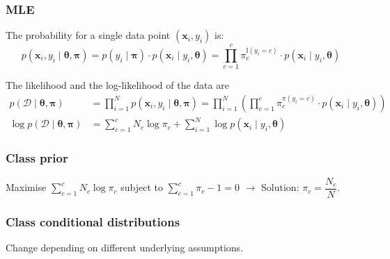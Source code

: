 \documentclass[11pt, %
	oneside, %
	english, %
	onehalfspacing, %
	parskip, %
	]{article} %
\theoremstyle{definition}
\begin{document}
\subsubsection*{MLE}

The probability for a single data point $\left(\mathbf{x}_i, y_i\right)$ is:
$$
p\left(\mathbf{x}_i, y_i \mid \boldsymbol{\theta}, \boldsymbol{\pi}\right)=p\left(y_i \mid \boldsymbol{\pi}\right) \cdot p\left(\mathbf{x}_i \mid y_i, \boldsymbol{\theta}\right)=\prod_{c=1}^c \pi_c^{\mathbb{I}\left(y_i=c\right)} \cdot p\left(\mathbf{x}_i \mid y_i, \boldsymbol{\theta}\right)
$$

The likelihood and the log-likelihood of the data are
$$
\begin{aligned}
p(\mathcal{D} \mid \boldsymbol{\theta}, \boldsymbol{\pi}) & =\prod_{i=1}^N p\left(\mathbf{x}_i, y_i \mid \boldsymbol{\theta}, \boldsymbol{\pi}\right)=\prod_{i=1}^N\left(\prod_{c=1}^c \pi_c^{\pi\left(y_i=c\right)} \cdot p\left(\mathbf{x}_i \mid y_i, \boldsymbol{\theta}\right)\right) \\
\log p(\mathcal{D} \mid \boldsymbol{\theta}, \boldsymbol{\pi}) & =\sum_{c=1}^c N_c \log \pi_c+\sum_{i=1}^N \log p\left(\mathbf{x}_i \mid y_i, \boldsymbol{\theta}\right)
\end{aligned}
$$

\subsubsection*{Class prior}
Maximise $\sum_{c=1}^c N_c \log \pi_c$ subject to $\sum_{c=1}^c \pi_c-1=0$ $\to$ Solution: $\pi_c = \dfrac{N_c}{N}$.

\subsubsection*{Class conditional distributions}

Change depending on different underlying assumptions.
\end{document}

